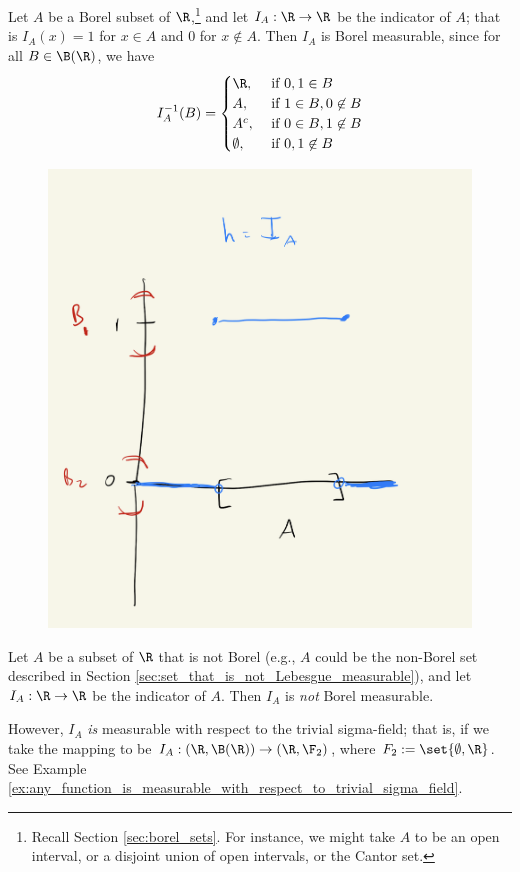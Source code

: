 \documentclass{article} %
\begin{document}

\begin{example}{}
Let $A$ be a Borel subset of $\R$,\footnote{Recall Section \ref{sec:borel_sets}.  For instance, we might take $A$ to be an open interval, or a disjoint union of open intervals, or the Cantor set.} and let $I_A : \R \to \R$ be the indicator of $A$; that is $I_A(x)=1$ for $x \in A$ and $0$ for $x \not\in A$. Then $I_A$ is Borel measurable, since for all $B \in \B(\R)$, we have
\[ I_A^{-1}(B) = 
\begin{cases}
\R, & \text{ if } 0,1 \in B\\ 
A, & \text{ if } 1 \in B, 0 \not\in B \\
A^c, & \text{ if } 0 \in B, 1 \not\in B \\	
\emptyset, & \text{ if } 0,1 \not\in B\\ 
\end{cases}
\]

\begin{figure}[H]
\centering
\includegraphics[width=.4\textwidth]{images/indicator_of_borel_set}	
\end{figure}

\end{example}

\begin{example}{}
Let $A$ be a subset of $\R$ that is not Borel (e.g., $A$ could be the non-Borel set described in Section \ref{sec:set_that_is_not_Lebesgue_measurable}), and let $I_A : \R \to \R$ be the indicator of $A$.   Then $I_A$ is \textit{not} Borel measurable.  

However, $I_A$  \textit{is} measurable with respect to the trivial sigma-field; that is, if we take the mapping to be $I_A : (\R, \B(\R)) \to (\R, \F_2)$, where $F_2 := \set{\emptyset, \R}$.  See Example \ref{ex:any_function_is_measurable_with_respect_to_trivial_sigma_field}.
\label{ex:indicators_of_non_borel_sets_are_not_borel_measurable}
\end{example}
\end{document}
